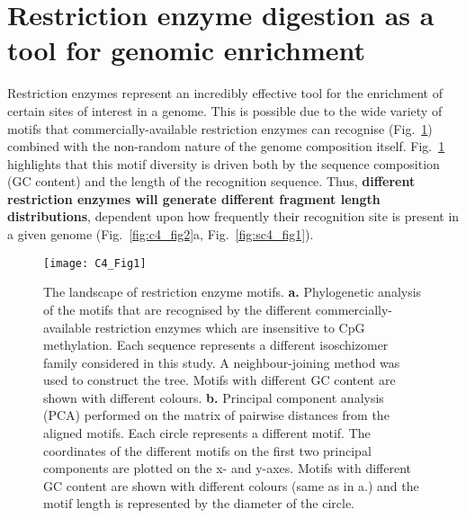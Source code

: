 \smallskip

\section{Restriction enzyme digestion as a tool for genomic enrichment}

\smallskip

Restriction enzymes represent an incredibly effective tool for the enrichment of certain sites of interest in a genome. This is possible due to the wide variety of motifs that commercially-available restriction enzymes can recognise (Fig.~\ref{fig:c4_fig1}) combined with the non-random nature of the genome composition itself. Fig.~\ref{fig:c4_fig1} highlights that this motif diversity is driven both by the sequence composition (\acrshort{GC content}) and the length of the recognition sequence. Thus, \textbf{different restriction enzymes will generate different fragment length distributions}, dependent upon how frequently their recognition site is present in a given genome (Fig.~\ref{fig:c4_fig2}a, Fig.~\ref{fig:sc4_fig1}).

\vspace{3.5mm}


\begin{figure}[htbp!] 
	\centering    
	\texttt{[image: C4\_Fig1]}
	\vspace*{1mm}
	\caption[The landscape of restriction enzyme motifs]{The landscape of restriction enzyme motifs. \textbf{a.} Phylogenetic analysis of the motifs that are recognised by the different commercially-available restriction enzymes which are insensitive to CpG methylation. Each sequence represents a different isoschizomer family considered in this study. A neighbour-joining method was used to construct the tree. Motifs with different GC content are shown with different colours. \textbf{b.} Principal component analysis (\acrshort{PCA}) performed on the matrix of pairwise distances from the aligned motifs. Each circle represents a different motif. The coordinates of the different motifs on the first two principal components are plotted on the x- and y-axes. Motifs with different GC content are shown with different colours (same as in a.) and the motif length is represented by the diameter of the circle.}
	\label{fig:c4_fig1}
\end{figure}


